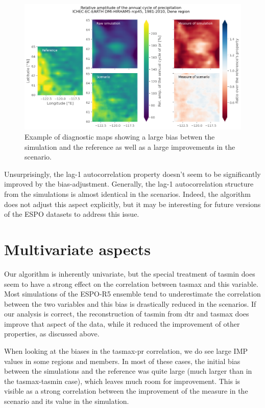 \documentclass[letterpaper,10pt]{article}
\begin{document}
\begin{figure}
\includegraphics[width=\textwidth]{../images/aca_pr_diags.png}
\caption{Example of diagnostic maps showing a large bias betwen the simulation and the reference as well as a large improvements in the scenario.}\label{fig:acapr}
\end{figure}


Unsurprisingly, the lag-1 autocorrelation property doesn't seem to be significantly improved by the bias-adjustment. Generally, the lag-1 autocorrelation structure from the simulations is almost identical in the scenarios. Indeed, the algorithm does not adjust this aspect explicitly, but it may be interesting for future versions of the ESPO datasets to address this issue.

\section{Multivariate aspects}
Our algorithm is inherently univariate, but the special treatment of tasmin does seem to have a strong effect on the correlation between tasmax and this variable. Most simulations of the ESPO-R5 ensemble tend to underestimate the correlation between the two variables and this bias is drastically reduced in the scenarios. If our analysis is correct, the reconstruction of tasmin from dtr and tasmax does improve that aspect of the data, while it reduced the improvement of other properties, as discussed above.

When looking at the biases in the tasmax-pr correlation, we do see large IMP values in some regions and members. In most of these cases, the initial bias between the simulations and the reference was quite large (much larger than in the tasmax-tasmin case), which leaves much room for improvement. This is visible as a strong correlation between the improvement of the measure in the scenario and its value in the simulation.
\end{document}
